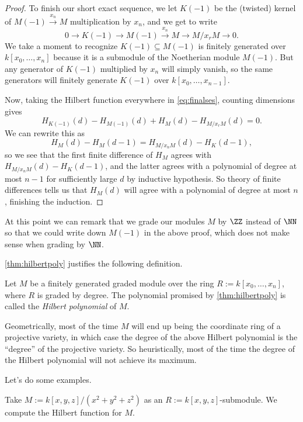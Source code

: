 \documentclass[../notes.tex]{subfiles}
\begin{document}
\begin{proof}
	To finish our short exact sequence, we let $K(-1)$ be the (twisted) kernel of $M(-1)\stackrel{x_n}\to M$ multiplication by $x_n$, and we get to write
	\[0\to K(-1)\to M(-1)\stackrel{x_n}\to M\to M/x_rM\to 0.\label{eq:finalses}\tag{$*$}\]
	We take a moment to recognize $K(-1)\subseteq M(-1)$ is finitely generated over $k[x_0,\ldots,x_n]$ because it is a submodule of the Noetherian module $M(-1)$. But any generator of $K(-1)$ multiplied by $x_n$ will simply vanish, so the same generators will finitely generate $K(-1)$ over $k[x_0,\ldots,x_{n-1}]$.

	Now, taking the Hilbert function everywhere in \autoref{eq:finalses}, counting dimensions gives
	\[H_{K(-1)}(d)-H_{M(-1)}(d)+H_M(d)-H_{M/x_rM}(d)=0.\]
	We can rewrite this as
	\[H_M(d)-H_M(d-1)=H_{M/x_nM}(d)-H_K(d-1),\]
	so we see that the first finite difference of $H_M$ agrees with $H_{M/x_nM}(d)-H_K(d-1)$, and the latter agrees with a polynomial of degree at most $n-1$ for sufficiently large $d$ by inductive hypothesis. So theory of finite differences tells us that $H_M(d)$ will agree with a polynomial of degree at most $n$, finishing the induction.
\end{proof}
\begin{remark}[Nir]
	At this point we can remark that we grade our modules $M$ by $\ZZ$ instead of $\NN$ so that we could write down $M(-1)$ in the above proof, which does not make sense when grading by $\NN$.
\end{remark}
\autoref{thm:hilbertpoly} justifies the following definition.
\begin{definition}
	Let $M$ be a finitely generated graded module over the ring $R:=k[x_0,\ldots,x_n]$, where $R$ is graded by degree. The polynomial promised by \autoref{thm:hilbertpoly} is called the \textit{Hilbert polynomial} of $M$.
\end{definition}
\begin{remark}
	Geometrically, most of the time $M$ will end up being the coordinate ring of a projective variety, in which case the degree of the above Hilbert polynomial is the ``degree'' of the projective variety. So heuristically, most of the time the degree of the Hilbert polynomial will not achieve its maximum.
\end{remark}
Let's do some examples.
\begin{exe}
	Take $M:=k[x,y,z]/\left(x^2+y^2+z^2\right)$ as an $R:=k[x,y,z]$-submodule. We compute the Hilbert function for $M$.
\end{exe}
\end{document}
